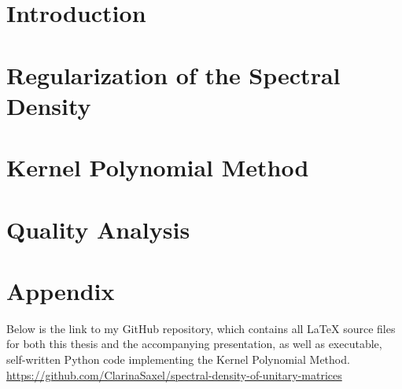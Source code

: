 \documentclass[11pt, a4paper]{report}
\theoremstyle{mydefinition}
\newcommand{\1}{\mathds{1}}
\begin{document}




\tableofcontents

\chapter{Introduction}


\chapter{Regularization of the Spectral Density}


\chapter{Kernel Polynomial Method}


\chapter{Quality Analysis}


\chapter{Appendix}
Below is the link to my GitHub repository, which contains all LaTeX source files for both this thesis and the accompanying presentation, as well as executable, self-written Python code implementing the Kernel Polynomial Method.
\url{https://github.com/ClarinaSaxel/spectral-density-of-unitary-matrices}


    
\end{document}
